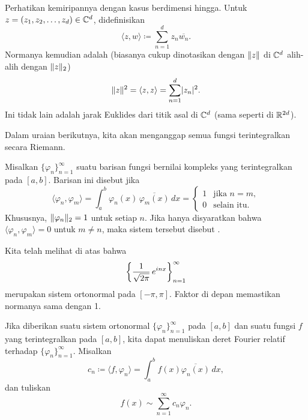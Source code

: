 \begin{remark}
Perhatikan kemiripannya dengan kasus berdimensi hingga.
Untuk $z = (z_1,z_2,\ldots,z_d) \in {\mathbb{C}}^d$, didefinisikan
\begin{equation*}
\langle z , w \rangle \coloneqq
\sum_{n=1}^d z_n \overline{w_n} .
\end{equation*}
Normanya kemudian adalah (biasanya cukup dinotasikan dengan $\lVert {z} \rVert$ di ${\mathbb{C}}^d$
alih-alih dengan $\lVert {z} \rVert_2$)
\begin{equation*}
\snorm{z}^2 = 
\langle z , z \rangle =
\sum_{n=1}^d \sabs{z_n}^2 .
\avoidbreak
\end{equation*}
Ini tidak lain adalah jarak Euklides dari titik asal di ${\mathbb{C}}^d$ (sama seperti
di ${\mathbb{R}}^{2d}$).
\end{remark}

Dalam uraian berikutnya, kita akan
menganggap semua fungsi terintegralkan secara Riemann.

\begin{defn}
Misalkan $\{ \varphi_n \}_{n=1}^\infty$ suatu barisan fungsi bernilai kompleks
yang terintegralkan pada $[a,b]$. Barisan ini disebut
\emph{} jika
\begin{equation*}
\langle \varphi_n , \varphi_m \rangle
=
\int_a^b \varphi_n(x) \, \overline{\varphi_m(x)} \, dx
= 
\begin{cases}
1 & \text{jika } n=m, \\
0 & \text{selain itu.}
\end{cases}
\end{equation*}
Khususnya, $\lVert {\varphi_n} \rVert_2 = 1$ untuk setiap $n$. Jika hanya
disyaratkan bahwa
$\langle \varphi_n , \varphi_m \rangle = 0$ untuk $m \neq n$, maka
sistem tersebut disebut \emph{}.
\end{defn}

Kita telah melihat di atas bahwa
\begin{equation*}
{\left\{ \frac{1}{\sqrt{2\pi}} \, e^{inx} \right\}}_{n=1}^\infty
\avoidbreak
\end{equation*}
merupakan sistem ortonormal pada $[-\pi,\pi]$.
Faktor di depan memastikan normanya sama dengan 1.

Jika diberikan suatu sistem ortonormal $\{ \varphi_n \}_{n=1}^\infty$ pada $[a,b]$ dan suatu fungsi $f$
yang terintegralkan pada $[a,b]$, kita dapat menuliskan
deret Fourier relatif terhadap $\{ \varphi_n \}_{n=1}^\infty$. Misalkan
\begin{equation*}
c_n \coloneqq
\langle f , \varphi_n \rangle
=
\int_a^b f(x) \overline{\varphi_n(x)} \, dx ,
\end{equation*}
dan tuliskan
\begin{equation*}
f(x) \sim \sum_{n=1}^\infty c_n \varphi_n .
\end{equation*}

